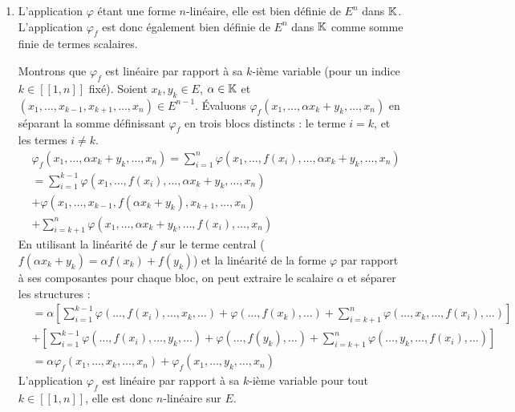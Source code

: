 \documentclass[12pt, a4paper]{report}
\begin{document}
\begin{enumerate}
    \item L'application $\varphi$ étant une forme $n$-linéaire, elle est bien définie de $E^n$ dans $\mathbb{K}$. L'application $\varphi_f$ est donc également bien définie de $E^n$ dans $\mathbb{K}$ comme somme finie de termes scalaires.
    
    Montrons que $\varphi_f$ est linéaire par rapport à sa $k$-ième variable (pour un indice $k \in [\![1,n]\!]$ fixé). 
    Soient $x_k, y_k \in E$, $\alpha \in \mathbb{K}$ et $(x_1, \dots, x_{k-1}, x_{k+1}, \dots, x_n) \in E^{n-1}$. Évaluons $\varphi_f(x_1, \dots, \alpha x_k + y_k, \dots, x_n)$ en séparant la somme définissant $\varphi_f$ en trois blocs distincts : le terme $i = k$, et les termes $i \neq k$.
    \begin{align*}
        &\varphi_f(x_1, \dots, \alpha x_k + y_k, \dots, x_n) = \sum_{i=1}^n \varphi(x_1, \dots, f(x_i), \dots, \alpha x_k + y_k, \dots, x_n) \\
        &= \sum_{i=1}^{k-1} \varphi(x_1, \dots, f(x_i), \dots, \alpha x_k + y_k, \dots, x_n) \\
        &+ \varphi(x_1, \dots, x_{k-1}, f(\alpha x_k + y_k), x_{k+1}, \dots, x_n) \\
        &+ \sum_{i=k+1}^n \varphi(x_1, \dots, \alpha x_k + y_k, \dots, f(x_i), \dots, x_n)
    \end{align*}
    En utilisant la linéarité de $f$ sur le terme central ($f(\alpha x_k + y_k) = \alpha f(x_k) + f(y_k)$) et la linéarité de la forme $\varphi$ par rapport à ses composantes pour chaque bloc, on peut extraire le scalaire $\alpha$ et séparer les structures :
    \begin{align*}
        &= \alpha \left[ \sum_{i=1}^{k-1} \varphi(\dots, f(x_i), \dots, x_k, \dots) + \varphi(\dots, f(x_k), \dots) + \sum_{i=k+1}^n \varphi(\dots, x_k, \dots, f(x_i), \dots) \right] \\
        &+ \left[ \sum_{i=1}^{k-1} \varphi(\dots, f(x_i), \dots, y_k, \dots) + \varphi(\dots, f(y_k), \dots) + \sum_{i=k+1}^n \varphi(\dots, y_k, \dots, f(x_i), \dots) \right] \\
        &= \alpha \varphi_f(x_1, \dots, x_k, \dots, x_n) + \varphi_f(x_1, \dots, y_k, \dots, x_n)
    \end{align*}
    L'application $\varphi_f$ est linéaire par rapport à sa $k$-ième variable pour tout $k \in [\![1,n]\!]$, elle est donc $n$-linéaire sur $E$.


\end{enumerate}
\end{document}
